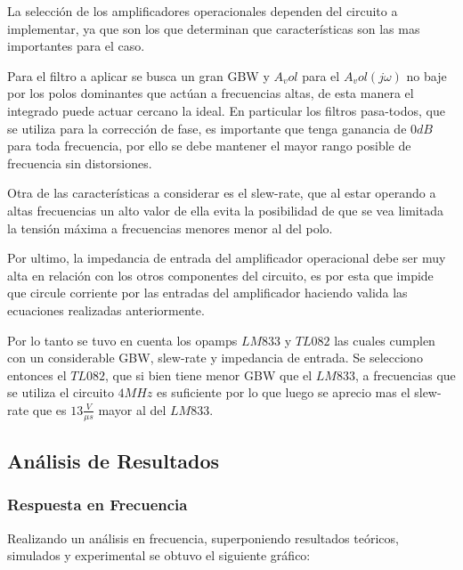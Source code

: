 La selección de los amplificadores operacionales dependen del circuito a implementar, ya que son los que determinan que características son las mas importantes para el caso.

Para el filtro a aplicar se busca un gran GBW y $A_vol$ para el $A_vol(j\omega)$ no baje por los polos dominantes que actúan a frecuencias altas, de esta manera el integrado puede actuar cercano la ideal. En particular los filtros pasa-todos, que se utiliza para la corrección de fase, es importante que tenga ganancia de $0dB$ para toda frecuencia, por ello se debe mantener el mayor rango posible de frecuencia sin distorsiones. 

Otra de las características a considerar es el slew-rate, que al estar operando a altas frecuencias un alto valor de ella evita la posibilidad de que se vea limitada la tensión máxima a frecuencias menores menor al del polo. 

Por ultimo, la impedancia de entrada del amplificador operacional debe ser muy alta en relación con los otros componentes del circuito, es por esta que impide que circule corriente por las entradas del amplificador haciendo valida las ecuaciones realizadas anteriormente. 

Por lo tanto se tuvo en cuenta los opamps $LM833$ y $TL082$ las cuales cumplen con un considerable GBW, slew-rate y impedancia de entrada. Se selecciono entonces el $TL082$, que si bien tiene menor GBW que el $LM833$, a frecuencias que se utiliza el circuito $4MHz$ es suficiente por lo que luego se aprecio mas el slew-rate que es $13\frac{V}{\mu s}$ mayor al del $LM833$. 

\subsection{Análisis de Resultados}

\subsubsection{Respuesta en Frecuencia}

Realizando un análisis en frecuencia, superponiendo resultados teóricos, simulados y experimental se obtuvo el siguiente gráfico:


